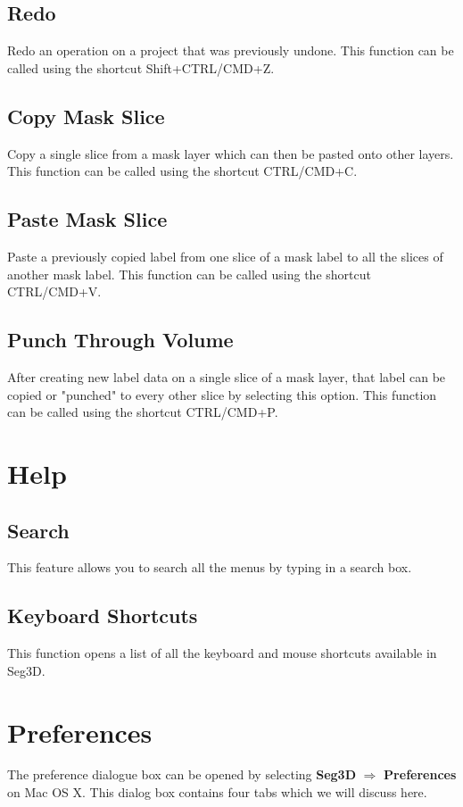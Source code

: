 \documentclass[fleqn,11pt,openany]{book}
\begin{document}
\subsection{Redo}
Redo an operation on a project that was previously undone. This function can be called using the shortcut Shift+CTRL/CMD+Z.


\subsection{Copy Mask Slice}
\label{sec:copy}
Copy a single slice from a mask layer which can then be pasted onto other layers. This function can be called using the shortcut CTRL/CMD+C.


\subsection{Paste Mask Slice}
\label{sec:paste}
Paste a previously copied label from one slice of a mask label to all the slices of another mask label. This function can be called using the shortcut CTRL/CMD+V.


\subsection{Punch Through Volume}
\label{sec:punch}
After creating new label data on a single slice of a mask layer, that label can be copied or "punched" to every other slice by
selecting this option. This function can be called using the shortcut CTRL/CMD+P.


\section{Help}
\subsection{Search}
This feature allows you to search all the menus by typing in a search box.

\subsection{Keyboard Shortcuts}
This function opens a list of all the keyboard and mouse shortcuts available in Seg3D.

\section{Preferences}
\label{sec:preferences}
The preference dialogue box can be opened by selecting \textbf{Seg3D} $\Rightarrow$ \textbf{Preferences} on Mac OS X.
This dialog box contains four tabs which we will discuss here.
\end{document}
